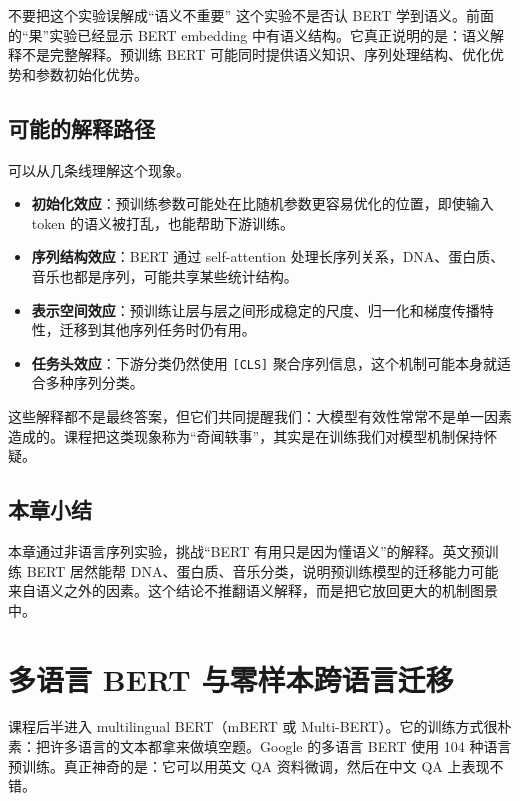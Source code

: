 \documentclass[a4paper]{article}
\begin{document}
\begin{warningbox}{不要把这个实验误解成“语义不重要”}
    这个实验不是否认 BERT 学到语义。前面的“果”实验已经显示 BERT embedding 中有语义结构。它真正说明的是：语义解释不是完整解释。预训练 BERT 可能同时提供语义知识、序列处理结构、优化优势和参数初始化优势。
\end{warningbox}

\subsection{可能的解释路径}

可以从几条线理解这个现象。

\begin{itemize}
    \item \textbf{初始化效应}：预训练参数可能处在比随机参数更容易优化的位置，即使输入 token 的语义被打乱，也能帮助下游训练。
    \item \textbf{序列结构效应}：BERT 通过 self-attention 处理长序列关系，DNA、蛋白质、音乐也都是序列，可能共享某些统计结构。
    \item \textbf{表示空间效应}：预训练让层与层之间形成稳定的尺度、归一化和梯度传播特性，迁移到其他序列任务时仍有用。
    \item \textbf{任务头效应}：下游分类仍然使用 \texttt{[CLS]} 聚合序列信息，这个机制可能本身就适合多种序列分类。
\end{itemize}

这些解释都不是最终答案，但它们共同提醒我们：大模型有效性常常不是单一因素造成的。课程把这类现象称为“奇闻轶事”，其实是在训练我们对模型机制保持怀疑。

\subsection{本章小结}

本章通过非语言序列实验，挑战“BERT 有用只是因为懂语义”的解释。英文预训练 BERT 居然能帮 DNA、蛋白质、音乐分类，说明预训练模型的迁移能力可能来自语义之外的因素。这个结论不推翻语义解释，而是把它放回更大的机制图景中。

\section{多语言 BERT 与零样本跨语言迁移}

课程后半进入 multilingual BERT（mBERT 或 Multi-BERT）。它的训练方式很朴素：把许多语言的文本都拿来做填空题。Google 的多语言 BERT 使用 104 种语言预训练。真正神奇的是：它可以用英文 QA 资料微调，然后在中文 QA 上表现不错。
\end{document}
